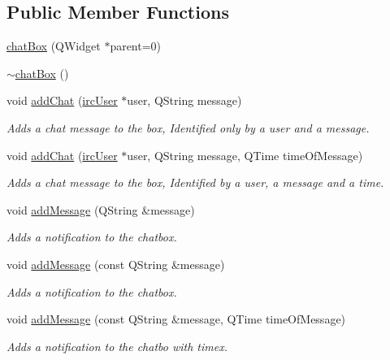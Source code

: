 \subsection*{Public Member Functions}
\begin{DoxyCompactItemize}
\item 
\hyperlink{classclient_1_1chat_box_a3687539a89f5c5ef806c578f90651440}{chat\-Box} (Q\-Widget $\ast$parent=0)
\item 
\hyperlink{classclient_1_1chat_box_a69c2a7a7b23a8a6a349dd780537a7df7}{$\sim$chat\-Box} ()
\item 
void \hyperlink{classclient_1_1chat_box_a1621c572958c7c6f34018eaee42533aa}{add\-Chat} (\hyperlink{classclient_1_1irc_user}{irc\-User} $\ast$user, Q\-String message)
\begin{DoxyCompactList}\small\item\em Adds a chat message to the box, Identified only by a user and a message. \end{DoxyCompactList}\item 
void \hyperlink{classclient_1_1chat_box_a0d303b9119fb4f1c9d7b406aab6adcaa}{add\-Chat} (\hyperlink{classclient_1_1irc_user}{irc\-User} $\ast$user, Q\-String message, Q\-Time time\-Of\-Message)
\begin{DoxyCompactList}\small\item\em Adds a chat message to the box, Identified by a user, a message and a time. \end{DoxyCompactList}\item 
void \hyperlink{classclient_1_1chat_box_ade0d82e9e4a985f239abc201693c2a58}{add\-Message} (Q\-String \&message)
\begin{DoxyCompactList}\small\item\em Adds a notification to the chatbox. \end{DoxyCompactList}\item 
void \hyperlink{classclient_1_1chat_box_aee3ca71af1723d364aa9edcd9bb44453}{add\-Message} (const Q\-String \&message)
\begin{DoxyCompactList}\small\item\em Adds a notification to the chatbox. \end{DoxyCompactList}\item 
void \hyperlink{classclient_1_1chat_box_aff3dde2175073f584e04ffb6a65027a3}{add\-Message} (const Q\-String \&message, Q\-Time time\-Of\-Message)
\begin{DoxyCompactList}\small\item\em Adds a notification to the chatbo with timex. \end{DoxyCompactList}\item 

\end{DoxyCompactItemize}
